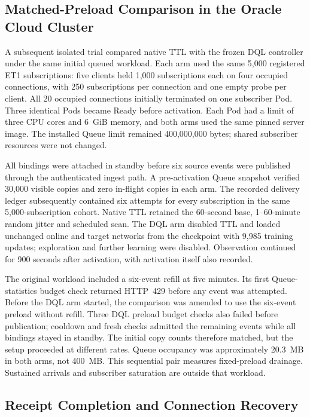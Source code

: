 \subsection{Matched-Preload Comparison in the Oracle Cloud Cluster}
\label{sec:ttl-preload-results}

A subsequent isolated trial compared native TTL with the frozen DQL controller
under the same initial queued workload. Each arm used the same 5,000 registered
ET1 subscriptions: five clients held 1,000 subscriptions each on four occupied
connections, with 250 subscriptions per connection and one empty probe per
client. All 20 occupied connections initially terminated on one subscriber Pod.
Three identical Pods became Ready before activation. Each Pod had a limit of
three CPU cores and 6~GiB memory, and both arms used the same pinned server image.
The installed Queue limit remained 400,000,000 bytes; shared subscriber
resources were not changed.

All bindings were attached in standby before six source events were published
through the authenticated ingest path. A pre-activation Queue snapshot verified
30,000 visible copies and zero in-flight copies in each arm. The recorded
delivery ledger subsequently contained six attempts for every subscription in
the same 5,000-subscription cohort. Native TTL retained the 60-second base,
1--60-minute random jitter and scheduled scan. The DQL arm disabled TTL and
loaded unchanged online and target networks from the checkpoint with 9,985
training updates; exploration and further learning were disabled. Observation
continued for 900 seconds after activation, with activation itself also recorded.

The original workload included a six-event refill at five minutes. Its first
Queue-statistics budget check returned HTTP~429 before any event was attempted.
Before the DQL arm started, the comparison was amended to use the six-event
preload without refill. Three DQL preload budget checks also failed before
publication; cooldown and fresh checks admitted the remaining events while all
bindings stayed in standby. The initial copy counts therefore matched, but the setup proceeded at
different rates. Queue occupancy was approximately 20.3~MB in both arms, not
400~MB. This sequential pair measures fixed-preload drainage. Sustained
arrivals and subscriber saturation are outside that workload.

\subsection{Receipt Completion and Connection Recovery}

